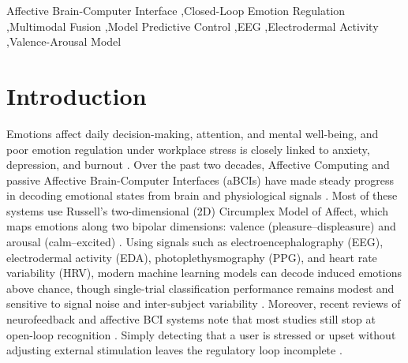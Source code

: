 \documentclass[a4paper,fleqn]{cas-dc}
\begin{document}
\begin{keywords}
Affective Brain-Computer Interface \sep Closed-Loop Emotion Regulation \sep Multimodal Fusion \sep Model Predictive Control \sep EEG \sep Electrodermal Activity \sep Valence-Arousal Model
\end{keywords}

\maketitle

\section{Introduction}\label{sec:intro}

Emotions affect daily decision-making, attention, and mental well-being, and poor emotion regulation under workplace stress is closely linked to anxiety, depression, and burnout \cite{palfi2024adaptive}. Over the past two decades, Affective Computing and passive Affective Brain-Computer Interfaces (aBCIs) have made steady progress in decoding emotional states from brain and physiological signals \cite{wu2023affective}. Most of these systems use Russell's two-dimensional (2D) Circumplex Model of Affect, which maps emotions along two bipolar dimensions: valence (pleasure--displeasure) and arousal (calm--excited) \cite{russell1980circumplex}. Using signals such as electroencephalography (EEG), electrodermal activity (EDA), photoplethysmography (PPG), and heart rate variability (HRV), modern machine learning models can decode induced emotions above chance, though single-trial classification performance remains modest and sensitive to signal noise and inter-subject variability \cite{wu2023affective,koelstra2012deap,saganowski2022emognition}. Moreover, recent reviews of neurofeedback and affective BCI systems note that most studies still stop at open-loop recognition \cite{zhang2026closed}. Simply detecting that a user is stressed or upset without adjusting external stimulation leaves the regulatory loop incomplete \cite{ewing2016evaluation,lorenz2016automatic,sayal2025music}.
\end{document}
